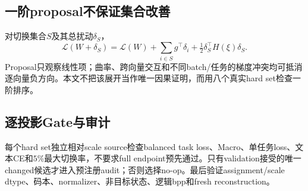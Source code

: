 \subsection{一阶proposal不保证集合改善}
对切换集合$S$及其总扰动$\delta_S$，
\begin{equation}
\mathcal L(W+\delta_S)=\mathcal L(W)+\sum_{i\in S}g^\top\delta_i+
\tfrac12\delta_S^\top H(\xi)\delta_S.
\end{equation}
Proposal只观察线性项；曲率、跨向量交互和不同batch/任务的梯度冲突均可抵消逐向量负方向。本文不把该展开当作唯一因果证明，而用八个真实hard set检查一阶排序。

\subsection{逐投影Gate与审计}
每个hard set独立相对scale source检查balanced task loss、Macro、单任务loss、文本CE和$5\%$最大切换率，不要求full endpoint预先通过。只有validation接受的唯一changed候选才进入预注册audit；否则选择no-op。最后验证assignment/scale dtype、码本、normalizer、非目标状态、逻辑bpp和fresh reconstruction。
